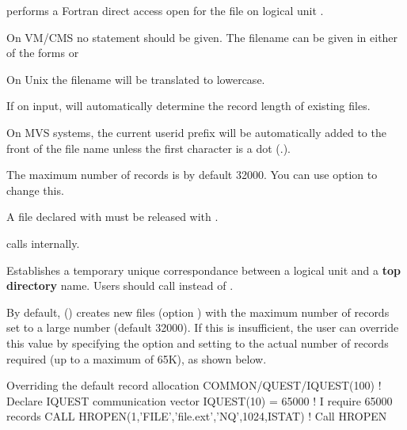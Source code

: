 \Remarks
\begin{UL}
\item {} performs a Fortran direct access open for
      the file  on logical unit . 
\item On VM/CMS no  statement should be given.
      The filename  can be given in either of the forms
       or 
\item On Unix the filename  will be translated to lowercase.
\item If  on input,  will automatically determine the
      record length of existing files.
\item On MVS systems, the current userid prefix will be automatically
      added to the front of the file name unless the first character
      is a dot (.).
\item The maximum number of records is by default 32000.
      You can use option  to change this.
\item A file declared with  must be released with .
\item {} calls  internally.
\end{UL} 

\newpage%

 
\Action
Establishes a temporary unique correspondance
between a logical unit and a {\bf top directory} name.
Users should call  instead of .
 
By default,  () creates new files (option ) with 
the maximum number of records set to a large number (default 32000). 
If this is insufficient, the user can override this
value by specifying the  option and setting  to the
actual number of records required (up to a maximum of 65K), as shown below.
\begin{XMPt}{Overriding the default record allocation}
      COMMON/QUEST/IQUEST(100)                         ! Declare IQUEST communication vector
      IQUEST(10) = 65000                               ! I require 65000 records
      CALL HROPEN(1,'FILE','file.ext','NQ',1024,ISTAT) ! Call HROPEN
\end{XMPt}

